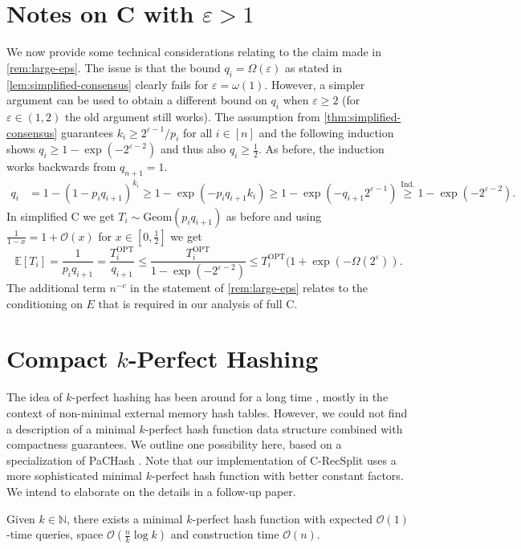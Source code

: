 \documentclass[cleveref,thm-restate]{lipics-v2021}
\def\Geom{\mathrm{Geom}}
\def\OPT{\mathrm{OPT}}
\def\consensus{\texorpdfstring{C\scalebox{0.8}{ONSENSUS}}{CONSENSUS}\xspace}
\def\textrel#1#2{\stackrel{\text{#1}}{#2}}
\begin{document}
\section{Notes on \consensus with \texorpdfstring{$ε > 1$}{ε > 1}}
\label{sec:large-eps}

We now provide some technical considerations relating to the claim made in \cref{rem:large-eps}. The issue is that the bound $q_i = Ω(ε)$ as stated in \cref{lem:simplified-consensus} clearly fails for $ε = ω(1)$. However, a simpler argument can be used to obtain a different bound on $q_i$ when $ε ≥ 2$ (for $ε ∈ (1,2)$ the old argument still works). The assumption from \cref{thm:simplified-consensus} guarantees $k_i ≥ 2^{ε-1}/p_i$ for all $i ∈ [n]$ and the following induction shows $q_i ≥ 1-\exp(-2^{ε-2})$ and thus also $q_i ≥ \frac{1}{2}$. As before, the induction works backwards from $q_{n+1} = 1$.
\begin{align*}
    q_i &= 1-(1-p_iq_{i+1})^{k_i}
    ≥ 1-\exp(-p_i q_{i+1} k_i)
    ≥ 1-\exp(-q_{i+1} 2^{ε-1})
    \textrel{Ind.}{≥} 1-\exp(-2^{ε-2}).
\end{align*}
In simplified \consensus we get $T_i \sim \Geom(p_i q_{i+1})$ as before and using $\frac{1}{1-x} = 1+𝒪(x)$ for $x ∈ [0,\frac 12]$ we get
\[
    𝔼[T_i]
    = \frac{1}{p_i q_{i+1}}
    = \frac{T_i^\OPT}{q_{i+1}}
    ≤ \frac{T_i^\OPT}{1-\exp(-2^{ε-2})}
    ≤ T_i^\OPT (1+\exp(-Ω(2^{ε})).
\]
The additional term $n^{-c}$ in the statement of \cref{rem:large-eps} relates to the conditioning on $E$ that is required in our analysis of full \consensus.

\section{Compact \texorpdfstring{$k$}{k}-Perfect Hashing}
\label{sec:k-perfect}

The idea of $k$-perfect hashing has been around for a long time \cite{belazzougui2009hash,gonnet1988external,larson1985external}, mostly in the context of non-minimal external memory hash tables.
However, we could not find a description of a minimal $k$-perfect hash function data structure combined with compactness guarantees.
We outline one possibility here, based on a specialization of PaCHash \cite{KLS:PaCHash:2023}.
Note that our implementation of \consensus-RecSplit uses a more sophisticated minimal $k$-perfect hash function with better constant factors. We intend to elaborate on the details in a follow-up paper.

\begin{lemma}
    \label{lem:k-mphf}
    Given $k ∈ ℕ$, there exists a minimal $k$-perfect hash function with expected $𝒪(1)$-time queries, space $𝒪(\frac{n}{k}\log k)$ and construction time $𝒪(n)$.
\end{lemma}
\end{document}
